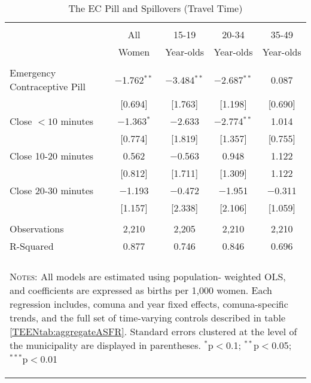 \begin{table}[!htbp] \centering
\caption{The EC Pill and Spillovers (Travel Time)}
\label{TEENtab:SpilloverTime} \begin{tabular}
{@{\extracolsep{5pt}}lcccc}\\[-1.8ex]\hline\hline\\
[-1.8ex] & All & 15-19 & 20-34 & 35-49 \\
& Women & Year-olds & Year-olds & Year-olds \\ \midrule
& & & & \\
Emergency Contraceptive Pill &$-$1.762$^{**}$&$-$3.484$^{**}$&$-$2.687$^{**}$& 0.087\\
&[0.694]&[1.763]&[1.198]&[0.690]\\
Close $<10$ minutes &$-$1.363$^{*}$&$-$2.633&$-$2.774$^{**}$& 1.014\\
&[0.774]&[1.819]&[1.357]&[0.755]\\
Close 10-20 minutes & 0.562&$-$0.563& 0.948& 1.122\\
&[0.812]&[1.711]&[1.309]& 1.122\\
Close 20-30 minutes &$-$1.193&$-$0.472&$-$1.951&$-$0.311\\
&[1.157]&[2.338]&[2.106]&[1.059]\\
& & & & \\
Observations&2,210&2,205&2,210&2,210\\
R-Squared&0.877&0.746&0.846&0.696\\
\hline \hline \\[-1.8ex]
\multicolumn{5}{p{12.8cm}}{\begin{footnotesize}          
\textsc{Notes:} All models are estimated using population-
weighted OLS, and coefficients are expressed as births per 
1,000 women.  Each regression includes, comuna and year    
fixed effects, comuna-specific trends, and the full set of 
time-varying controls described in table                   
\ref{TEENtab:aggregateASFR}. Standard errors              
clustered at the level of the municipality are displayed in
parentheses.
$^{*}$p$<$0.1; $^{**}$p$<$0.05; $^{***}$p$<$0.01\end{footnotesize}}
\normalsize\end{tabular}\end{table}

